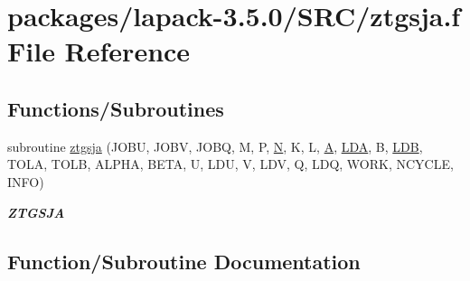 \hypertarget{ztgsja_8f}{}\section{packages/lapack-\/3.5.0/\+S\+R\+C/ztgsja.f File Reference}
\label{ztgsja_8f}
\subsection*{Functions/\+Subroutines}
\begin{DoxyCompactItemize}
\item 
subroutine \hyperlink{ztgsja_8f_ade61d8e6d687e1c1f1e81aafd56e77f2}{ztgsja} (J\+O\+B\+U, J\+O\+B\+V, J\+O\+B\+Q, M, P, \hyperlink{polmisc_8c_a0240ac851181b84ac374872dc5434ee4}{N}, K, L, \hyperlink{classA}{A}, \hyperlink{example__user_8c_ae946da542ce0db94dced19b2ecefd1aa}{L\+D\+A}, B, \hyperlink{example__user_8c_a50e90a7104df172b5a89a06c47fcca04}{L\+D\+B}, T\+O\+L\+A, T\+O\+L\+B, A\+L\+P\+H\+A, B\+E\+T\+A, U, L\+D\+U, V, L\+D\+V, Q, L\+D\+Q, W\+O\+R\+K, N\+C\+Y\+C\+L\+E, I\+N\+F\+O)
\begin{DoxyCompactList}\small\item\em {\bfseries Z\+T\+G\+S\+J\+A} \end{DoxyCompactList}\end{DoxyCompactItemize}


\subsection{Function/\+Subroutine Documentation}
\hypertarget{ztgsja_8f_ade61d8e6d687e1c1f1e81aafd56e77f2}{}
